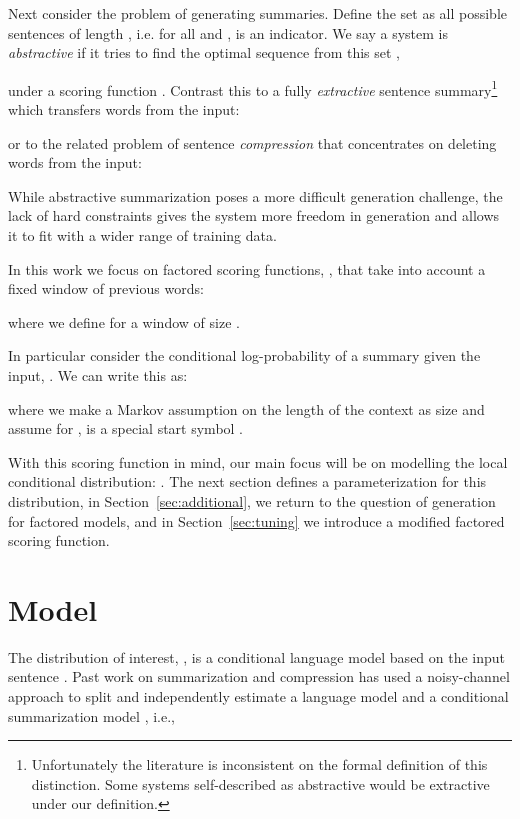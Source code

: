 \documentclass[11pt,a4paper]{article}
\begin{document}
Next consider the problem of generating summaries. Define the set  as all possible sentences of
length , i.e. for all  and ,  is an
indicator.  We say a system is \textit{abstractive} if it tries to
find the optimal sequence from this set , 

\noindent under a scoring function . Contrast this to a fully
\textit{extractive} sentence summary\footnote{Unfortunately the literature is inconsistent on the formal definition of this distinction. Some systems self-described as abstractive would be extractive under our definition. } which transfers words from the input:
  
\noindent or to the related problem of sentence \textit{compression} that concentrates on deleting words from the input: 

While abstractive summarization poses a more difficult generation challenge, the lack of hard constraints gives the system more freedom in generation and allows it to fit with a wider range of training data.

In this work we focus on factored scoring functions, , that take into account a fixed window of previous words:

\noindent where we define  for a window of size . 

In particular consider the conditional log-probability of a summary given the input, . We can write this as:


\noindent where we make a Markov assumption on the length of the
context as size  and assume for ,   is a special start symbol . 

With this scoring function in mind, our main focus will
be on modelling the local conditional distribution: . The next section defines a parameterization for
this distribution,
in Section~\ref{sec:additional}, we return to
the question of generation for factored models, and 
in Section~\ref{sec:tuning} we introduce
a modified factored scoring function.

 
\section{Model}
\label{sec:model}

The distribution of interest, , is  a conditional language model based on the input
sentence . Past work on summarization and compression has used
a noisy-channel approach to split and independently estimate a 
language model and a conditional summarization model \cite{banko2000headline,knight2002summarization,daume2002noisy},
i.e.,
\end{document}
